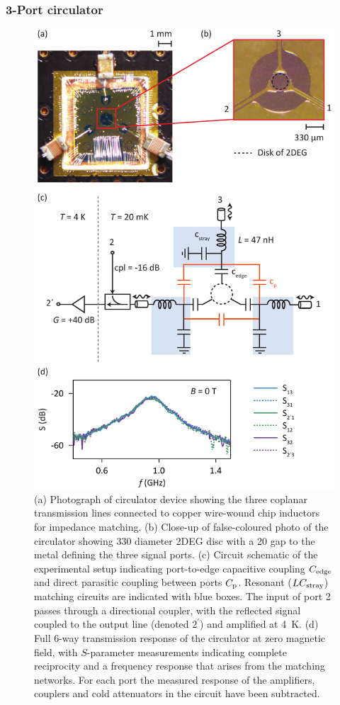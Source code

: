 \subsubsection{3-Port circulator}
\begin{figure}
\includegraphics[width=0.7\columnwidth]{fig2_QH}
\caption[Experimental setup for determining the response of the on-chip circulator]{\label{FIG. 2.}
(a) Photograph of circulator device showing the three coplanar transmission lines connected to copper wire-wound chip inductors for impedance matching. 
(b) Close-up of false-coloured photo of the circulator showing \SI{330}{\micron} diameter 2DEG disc with a \SI{20}{\micron} gap to the metal defining the three signal ports. 
(c) Circuit schematic of the experimental setup indicating port-to-edge capacitive coupling $C_{\rm edge}$ and direct parasitic coupling between ports $C_{\rm p}$. Resonant ($LC_{\rm stray}$) matching circuits are indicated with blue boxes. The input of port 2 passes through a directional coupler, with the reflected signal coupled to the output line (denoted $2^\prime$) and amplified at \SI{4}{\kelvin}. 
(d) Full 6-way transmission response of the circulator at zero magnetic field, with $S$-parameter measurements indicating complete reciprocity and a frequency response that arises from the matching networks. For each port the measured response of the amplifiers, couplers and cold attenuators in the circuit have been subtracted.}
\end{figure}

